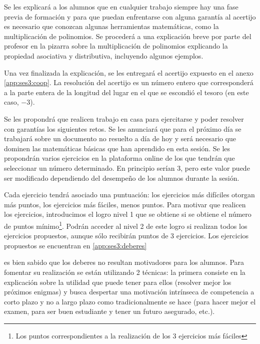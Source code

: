 Se les explicará a los alumnos que en cualquier trabajo siempre hay una fase previa de formación y para que puedan enfrentarse con alguna garantía al acertijo es necesario que conozcan algunas herramientas matemáticas, como la multiplicación de polinomios.
%
Se procederá a una explicación breve por parte del profesor en la pizarra sobre la multiplicación de polinomios explicando la propiedad asociativa y distributiva, incluyendo algunos ejemplos.

Una vez finalizada la explicación, se les entregará el acertijo expuesto en el anexo \ref{app:ses3:coop}.
%
La resolución del acertijo es un número entero que corresponderá a la parte entera de la longitud del lugar en el que se escondió el tesoro (en este caso, $-3$).



Se les propondrá que realicen trabajo en casa para ejercitarse y poder resolver con garantías los siguientes retos.
%
Se les anunciará que para el próximo día se trabajará sobre un documento no resuelto a día de hoy y será necesario que dominen las matemáticas básicas que han aprendido en esta sesión.
%
Se les propondrán varios ejercicios en la plataforma online de los que tendrán que seleccionar un número determinado. 
%
En principio serían 3, pero este valor puede ser modificado dependiendo del desempeño de los alumnos durante la sesión.

Cada ejercicio tendrá asociado una puntuación: los ejercicios más difíciles otorgan más puntos, los ejercicios más fáciles, menos puntos.
%
%
Para motivar que realicen los ejercicios, introducimos el logro  nivel 1 que se obtiene si se obtiene el número de puntos mínimo\footnote{Los puntos correspondientes a la realización de los 3 ejercicios más fáciles}.
%
Podrán acceder al nivel 2 de este logro si realizan todos los ejercicios propuestos, aunque sólo recibirán puntos de 3 ejercicios.
%
Los ejercicios propuestos se encuentran en \ref{app:ses3:deberes}

	es bien sabido que los deberes no resultan motivadores para los alumnos. 
	Para fomentar su realización se están utilizando 2 técnicas: 
	la primera consiste en la explicación sobre la utilidad que puede tener para ellos (resolver mejor los próximos enigmas) y busca despertar una motivación intrínseca de competencia a corto plazo y no a largo plazo como tradicionalmente se hace (para hacer mejor el examen, para ser buen estudiante y tener un futuro asegurado, etc.).
	
